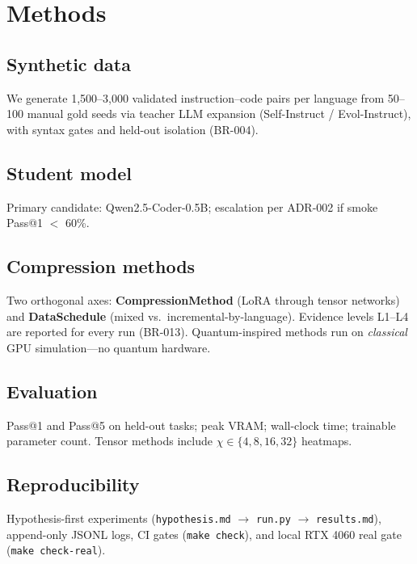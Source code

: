 \section{Methods}

\subsection{Synthetic data}
We generate 1,500--3,000 validated instruction--code pairs per language from 50--100 manual gold seeds via teacher LLM expansion (Self-Instruct / Evol-Instruct), with syntax gates and held-out isolation (BR-004).

\subsection{Student model}
Primary candidate: Qwen2.5-Coder-0.5B; escalation per ADR-002 if smoke Pass@1 $<$ 60\%.

\subsection{Compression methods}
Two orthogonal axes: \textbf{CompressionMethod} (LoRA through tensor networks) and \textbf{DataSchedule} (mixed vs.\ incremental-by-language).
Evidence levels L1--L4 are reported for every run (BR-013).
Quantum-inspired methods run on \emph{classical} GPU simulation---no quantum hardware.

\subsection{Evaluation}
Pass@1 and Pass@5 on held-out tasks; peak VRAM; wall-clock time; trainable parameter count.
Tensor methods include $\chi \in \{4,8,16,32\}$ heatmaps.

\subsection{Reproducibility}
Hypothesis-first experiments (\texttt{hypothesis.md} $\rightarrow$ \texttt{run.py} $\rightarrow$ \texttt{results.md}), append-only JSONL logs, CI gates (\texttt{make check}), and local RTX 4060 real gate (\texttt{make check-real}).
